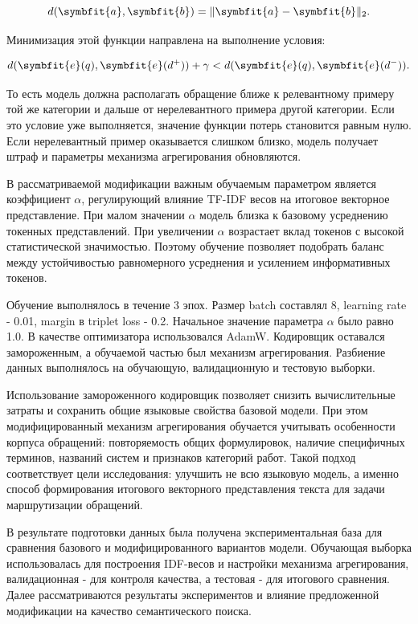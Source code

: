 \documentclass[14pt,a4paper]{extarticle}
\numberwithin{figure}{section}
\numberwithin{table}{section}
\begin{document}
\begin{equation}d(\symbfit{a},\symbfit{b})=\|\symbfit{a}-\symbfit{b}\|_2.\label{eq:euclidean-distance}\end{equation}

Минимизация этой функции направлена на выполнение условия:

\begin{equation}d(\symbfit{e}(q),\symbfit{e}(d^+))+\gamma<d(\symbfit{e}(q),\symbfit{e}(d^-)).\label{eq:triplet-condition}\end{equation}

То есть модель должна располагать обращение ближе к релевантному примеру
той же категории и дальше от нерелевантного примера другой категории.
Если это условие уже выполняется, значение функции потерь становится
равным нулю. Если нерелевантный пример оказывается слишком близко,
модель получает штраф и параметры механизма агрегирования обновляются.

В рассматриваемой модификации важным обучаемым параметром является
коэффициент \(\alpha\), регулирующий влияние TF-IDF весов на итоговое
векторное представление. При малом значении \(\alpha\) модель близка к базовому усреднению токенных представлений. При увеличении \(\alpha\) возрастает вклад токенов с высокой
статистической значимостью. Поэтому обучение позволяет подобрать баланс
между устойчивостью равномерного усреднения и усилением информативных
токенов.

Обучение выполнялось в течение 3 эпох. Размер batch составлял 8,
learning rate - 0.01, margin в triplet loss - 0.2. Начальное значение
параметра \(\alpha\) было равно 1.0. В качестве оптимизатора использовался
AdamW. Кодировщик оставался замороженным, а обучаемой частью был
механизм агрегирования. Разбиение данных выполнялось на обучающую,
валидационную и тестовую выборки.

Использование замороженного кодировщик позволяет снизить вычислительные
затраты и сохранить общие языковые свойства базовой модели. При этом
модифицированный механизм агрегирования обучается учитывать особенности
корпуса обращений: повторяемость общих формулировок, наличие специфичных
терминов, названий систем и признаков категорий работ. Такой подход
соответствует цели исследования: улучшить не всю языковую модель, а
именно способ формирования итогового векторного представления текста для задачи
маршрутизации обращений.

В результате подготовки данных была получена экспериментальная база для
сравнения базового и модифицированного вариантов модели. Обучающая
выборка использовалась для построения IDF-весов и настройки
механизма агрегирования, валидационная - для контроля качества, а тестовая -
для итогового сравнения. Далее рассматриваются результаты экспериментов
и влияние предложенной модификации на качество семантического поиска.
\end{document}
